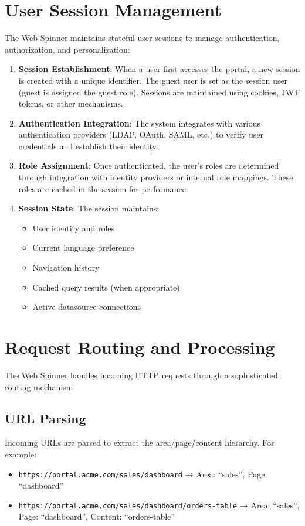 \section{User Session Management}

The Web Spinner maintains stateful user sessions to manage authentication, authorization, and personalization:

\begin{enumerate}
\item \textbf{Session Establishment}: When a user first accesses the portal, a new session is created with a unique identifier. The guest user is set as the session user (guest is assigned the guest role). Sessions are maintained using cookies, JWT tokens, or other mechanisms.

\item \textbf{Authentication Integration}: The system integrates with various authentication providers (LDAP, OAuth, SAML, etc.) to verify user credentials and establish their identity.

\item \textbf{Role Assignment}: Once authenticated, the user's roles are determined through integration with identity providers or internal role mappings. These roles are cached in the session for performance.

\item \textbf{Session State}: The session maintains:
\begin{itemize}
\item User identity and roles
\item Current language preference
\item Navigation history
\item Cached query results (when appropriate)
\item Active datasource connections
\end{itemize}
\end{enumerate}

\section{Request Routing and Processing}

The Web Spinner handles incoming HTTP requests through a sophisticated routing mechanism:

\subsection{URL Parsing}
Incoming URLs are parsed to extract the area/page/content hierarchy. For example:
\begin{itemize}
\item \texttt{https://portal.acme.com/sales/dashboard} → Area: ``sales'', Page: ``dashboard''
\item \texttt{https://portal.acme.com/sales/dashboard/orders-table} → Area: ``sales'', Page: ``dashboard'', Content: ``orders-table''
\end{itemize}

